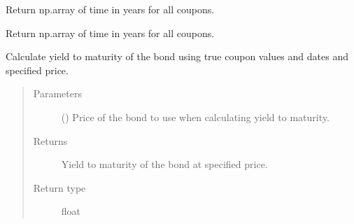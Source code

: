\documentclass[letterpaper,10pt,english]{report}
\begin{document}
\begin{fulllineitems}
\begin{fulllineitems}
\end{fulllineitems}


\begin{fulllineitems}
\label{\detokenize{index:lgimapy.models.TBond.coupon_days}}
Return np.array of time in years for all coupons.

\end{fulllineitems}


\begin{fulllineitems}
Return np.array of time in years for all coupons.

\end{fulllineitems}


\begin{fulllineitems}
\label{\detokenize{index:lgimapy.models.TBond.theoretical_ytm}}
Calculate yield to maturity of the bond using true coupon
values and dates and specified price.
\begin{quote}\begin{description}
\item[{Parameters}] \leavevmode
{} () \textendash{} Price of the bond to use when calculating yield to maturity.

\item[{Returns}] \leavevmode
{} \textendash{} Yield to maturity of the bond at specified price.

\item[{Return type}] \leavevmode
float

\end{description}\end{quote}

\end{fulllineitems}



\end{fulllineitems}
\end{document}
